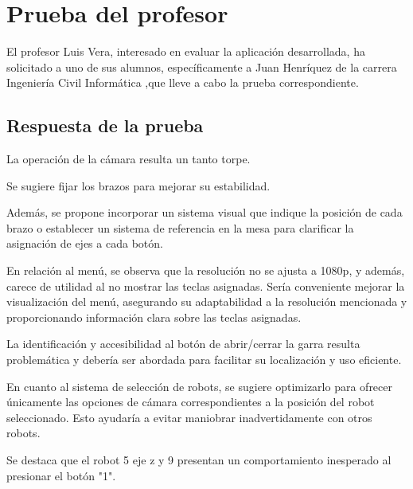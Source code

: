\section{Prueba del profesor}
El profesor Luis Vera, interesado en evaluar la aplicación desarrollada, ha solicitado a uno de sus alumnos, específicamente a Juan Henríquez de la carrera Ingeniería Civil Informática ,que lleve a cabo la prueba correspondiente. 

\subsection*{Respuesta de la prueba}
La operación de la cámara resulta un tanto torpe.

Se sugiere fijar los brazos para mejorar su estabilidad.

Además, se propone incorporar un sistema visual que indique la posición de cada brazo o establecer un sistema de referencia en la mesa para clarificar la asignación de ejes a cada botón.

En relación al menú, se observa que la resolución no se ajusta a 1080p, y además, carece de utilidad al no mostrar las teclas asignadas. Sería conveniente mejorar la visualización del menú, asegurando su adaptabilidad a la resolución mencionada y proporcionando información clara sobre las teclas asignadas.

La identificación y accesibilidad al botón de abrir/cerrar la garra resulta problemática y debería ser abordada para facilitar su localización y uso eficiente.

En cuanto al sistema de selección de robots, se sugiere optimizarlo para ofrecer únicamente las opciones de cámara correspondientes a la posición del robot seleccionado. Esto ayudaría a evitar maniobrar inadvertidamente con otros robots.

Se destaca que el robot 5 eje z y 9 presentan un comportamiento inesperado al presionar el botón "1".